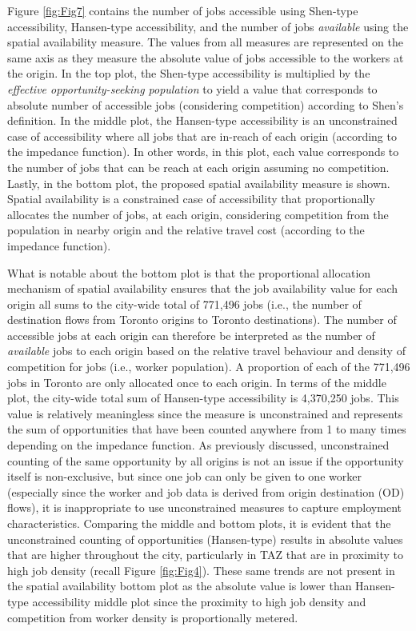 \documentclass[10pt,letterpaper]{article}
\begin{document}
Figure \ref{fig:Fig7} contains the number of jobs accessible using
Shen-type accessibility, Hansen-type accessibility, and the number of
jobs \emph{available} using the spatial availability measure. The values
from all measures are represented on the same axis as they measure the
absolute value of jobs accessible to the workers at the origin. In the
top plot, the Shen-type accessibility is multiplied by the
\emph{effective opportunity-seeking population} to yield a value that
corresponds to absolute number of accessible jobs (considering
competition) according to Shen's definition. In the middle plot, the
Hansen-type accessibility is an unconstrained case of accessibility
where all jobs that are in-reach of each origin (according to the
impedance function). In other words, in this plot, each value
corresponds to the number of jobs that can be reach at each origin
assuming no competition. Lastly, in the bottom plot, the proposed
spatial availability measure is shown. Spatial availability is a
constrained case of accessibility that proportionally allocates the
number of jobs, at each origin, considering competition from the
population in nearby origin and the relative travel cost (according to
the impedance function).

What is notable about the bottom plot is that the proportional
allocation mechanism of spatial availability ensures that the job
availability value for each origin all sums to the city-wide total of
771,496 jobs (i.e., the number of destination flows from Toronto origins
to Toronto destinations). The number of accessible jobs at each origin
can therefore be interpreted as the number of \emph{available} jobs to
each origin based on the relative travel behaviour and density of
competition for jobs (i.e., worker population). A proportion of each of
the 771,496 jobs in Toronto are only allocated once to each origin. In
terms of the middle plot, the city-wide total sum of Hansen-type
accessibility is 4,370,250 jobs. This value is relatively meaningless
since the measure is unconstrained and represents the sum of
opportunities that have been counted anywhere from 1 to many times
depending on the impedance function. As previously discussed,
unconstrained counting of the same opportunity by all origins is not an
issue if the opportunity itself is non-exclusive, but since one job can
only be given to one worker (especially since the worker and job data is
derived from origin destination (OD) flows), it is inappropriate to use
unconstrained measures to capture employment characteristics. Comparing
the middle and bottom plots, it is evident that the unconstrained
counting of opportunities (Hansen-type) results in absolute values that
are higher throughout the city, particularly in TAZ that are in
proximity to high job density (recall Figure \ref{fig:Fig4}). These same
trends are not present in the spatial availability bottom plot as the
absolute value is lower than Hansen-type accessibility middle plot since
the proximity to high job density and competition from worker density is
proportionally metered.
\end{document}
